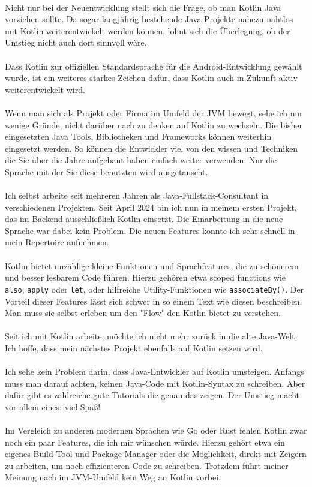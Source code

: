 \documentclass[11pt]{article}
\begin{document}
    \\
    Nicht nur bei der Neuentwicklung stellt sich die Frage, ob man Kotlin Java vorziehen sollte.
    Da sogar langjährig bestehende Java-Projekte nahezu nahtlos mit Kotlin weiterentwickelt werden können, lohnt sich die Überlegung, ob der Umstieg nicht auch dort sinnvoll wäre.\\
    \\
    Dass Kotlin zur offiziellen Standardsprache für die Android-Entwicklung gewählt wurde, ist ein weiteres starkes Zeichen dafür, dass Kotlin auch in Zukunft aktiv weiterentwickelt wird.\\
    \\
    Wenn man sich als Projekt oder Firma im Umfeld der JVM bewegt, sehe ich nur wenige Gründe, nicht darüber nach zu denken auf Kotlin zu wechseln.
    Die bisher eingesetzten Java Tools, Bibliotheken und Frameworks können weiterhin eingesetzt werden.
    So können die Entwickler viel von den wissen und Techniken die Sie über die Jahre aufgebaut haben einfach weiter verwenden.
    Nur die Sprache mit der Sie diese benutzten wird ausgetauscht.\\
    \\
    Ich selbst arbeite seit mehreren Jahren als Java-Fullstack-Consultant in verschiedenen Projekten.
    Seit April 2024 bin ich nun in meinem ersten Projekt, das im Backend ausschließlich Kotlin einsetzt.
    Die Einarbeitung in die neue Sprache war dabei kein Problem.
    Die neuen Features konnte ich sehr schnell in mein Repertoire aufnehmen.\\
    \\
    Kotlin bietet unzählige kleine Funktionen und Sprachfeatures, die zu schönerem und besser lesbarem Code führen.
    Hierzu gehören etwa scoped functions wie \texttt{also}, \texttt{apply} oder \texttt{let}, oder hilfreiche Utility-Funktionen wie \texttt{associateBy()}.
    Der Vorteil dieser Features lässt sich schwer in so einem Text wie diesen beschreiben.
    Man muss sie selbst erleben um den "Flow" den Kotlin bietet zu verstehen.\\
    \\
    Seit ich mit Kotlin arbeite, möchte ich nicht mehr zurück in die alte Java-Welt.
    Ich hoffe, dass mein nächstes Projekt ebenfalls auf Kotlin setzen wird.\\
    \\
    Ich sehe kein Problem darin, dass Java-Entwickler auf Kotlin umsteigen.
    Anfangs muss man darauf achten, keinen Java-Code mit Kotlin-Syntax zu schreiben.
    Aber dafür gibt es zahlreiche gute Tutorials die genau das zeigen.
    Der Umstieg macht vor allem eines: viel Spaß!\\
    \\
    Im Vergleich zu anderen modernen Sprachen wie Go oder Rust fehlen Kotlin zwar noch ein paar Features, die ich mir wünschen würde.
    Hierzu gehört etwa ein eigenes Build-Tool und Package-Manager oder die Möglichkeit, direkt mit Zeigern zu arbeiten, um noch effizienteren Code zu schreiben.
    Trotzdem führt meiner Meinung nach im JVM-Umfeld kein Weg an Kotlin vorbei.\\
\end{document}
